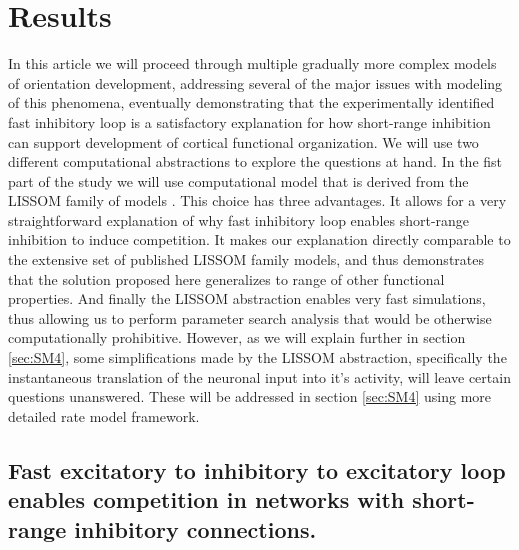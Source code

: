 \documentclass[a4paper,10pt]{article}
\begin{document}
\section{Results}

In this article we will proceed through multiple gradually more complex models of orientation development, addressing several 
of the major issues with modeling of this phenomena, eventually demonstrating that the experimentally identified fast inhibitory loop is a satisfactory explanation for how short-range inhibition can support development of cortical functional organization. We will use two different computational abstractions to explore the questions at hand. In the fist part of the study we will use computational model that is derived from the LISSOM family of models \cite{CMVC}. This choice has three advantages. It allows for a very straightforward explanation of why 
fast inhibitory loop enables short-range inhibition to induce competition. It makes our explanation directly comparable to the 
extensive set of published LISSOM family models, and thus demonstrates that the solution proposed here generalizes to range of other 
functional properties. And finally the LISSOM abstraction enables very fast simulations, thus allowing us to perform 
parameter search analysis that would be otherwise computationally prohibitive. However, as we will explain further in section \ref{sec:SM4}, some simplifications made by the LISSOM abstraction, specifically the instantaneous translation of the neuronal input into it's activity, will leave 
certain questions unanswered. These will be addressed in section \ref{sec:SM4} using more detailed rate model framework.


\subsection{Fast excitatory to inhibitory to excitatory loop enables competition in networks with short-range inhibitory connections.} \label{sec:SM1}
\end{document}
